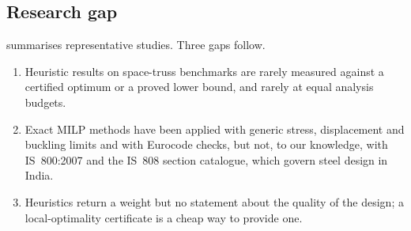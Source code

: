 \documentclass[lineno,pdflatex,sn-mathphys-num]{sn-jnl}
\begin{document}
\subsection{Research gap}
 summarises representative studies. Three gaps follow.
\begin{enumerate}
  \item Heuristic results on space-truss benchmarks are rarely measured against
        a certified optimum or a proved lower bound, and rarely at equal
        analysis budgets.
  \item Exact MILP methods have been applied with generic stress, displacement and buckling limits and with
        Eurocode checks, but not, to our knowledge, with IS~800:2007 and the
        IS~808 section catalogue, which govern steel design in India.
  \item Heuristics return a weight but no statement about the quality of the
        design; a local-optimality certificate is a cheap way to provide one.
\end{enumerate}

\begin{table}[tbp]
\centering\footnotesize
\caption{Representative studies on discrete or catalogue-based truss and frame
sizing. ``Proof'': global optimality is certified. ``Equal NFE'': all methods
compared at the same number of structural analyses.}
\label{tab:litgap}
\end{table}
\end{document}
